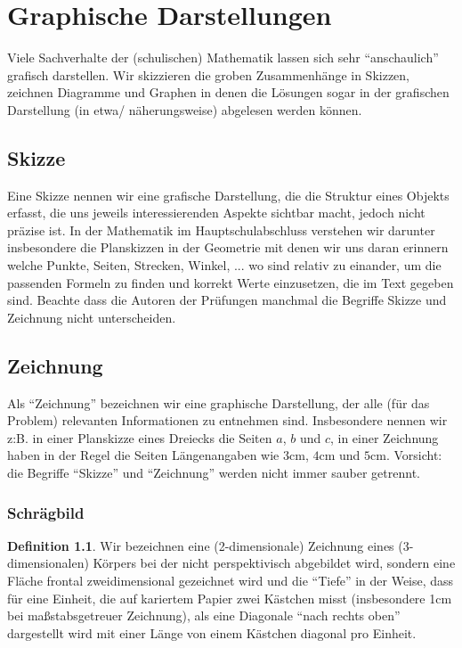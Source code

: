 \documentclass[a4paper]{book}%
\theoremstyle{definition}
\newtheorem{definition}{Definition}
\begin{document}
\chapter{Graphische Darstellungen}

Viele Sachverhalte der (schulischen) Mathematik lassen sich sehr \enquote{anschaulich} grafisch darstellen. Wir skizzieren die groben Zusammenhänge in Skizzen, zeichnen Diagramme und Graphen in denen die Lösungen sogar in der grafischen Darstellung (in etwa/ näherungsweise) abgelesen werden können.


\section{Skizze}

Eine Skizze nennen wir eine grafische Darstellung, die die Struktur eines Objekts erfasst, die uns jeweils interessierenden Aspekte sichtbar macht, jedoch nicht präzise ist. In der Mathematik im Hauptschulabschluss verstehen wir darunter insbesondere die Planskizzen in der Geometrie mit denen wir uns daran erinnern welche Punkte, Seiten, Strecken, Winkel, ... wo sind relativ zu einander, um die passenden Formeln zu finden und korrekt Werte einzusetzen, die im Text gegeben sind. Beachte dass die Autoren der Prüfungen manchmal die Begriffe Skizze und Zeichnung nicht unterscheiden.


\section{Zeichnung}

Als \enquote{Zeichnung} bezeichnen wir eine graphische Darstellung, der alle (für das Problem) relevanten Informationen zu entnehmen sind. Insbesondere nennen wir z:B. in einer Planskizze eines Dreiecks die Seiten $a$, $b$ und $c$, in einer Zeichnung haben in der Regel die Seiten Längenangaben wie $3 \text{cm}$, $4 \text{cm}$ und $5 \text{cm}$. Vorsicht: die Begriffe \enquote{Skizze} und \enquote{Zeichnung} werden nicht immer sauber getrennt.


\subsection{Schrägbild}\label{Schrägbild}

\begin{definition}
    Wir bezeichnen eine (2-dimensionale) Zeichnung eines (3-dimensionalen) Körpers bei der nicht perspektivisch abgebildet wird, sondern eine Fläche frontal zweidimensional gezeichnet wird und die \enquote{Tiefe} in der Weise, dass für eine Einheit, die auf kariertem Papier zwei Kästchen misst (insbesondere 1cm bei maßstabsgetreuer Zeichnung), als eine Diagonale \enquote{nach rechts oben} dargestellt wird mit einer Länge von einem Kästchen diagonal pro Einheit.
\end{definition}
\end{document}
